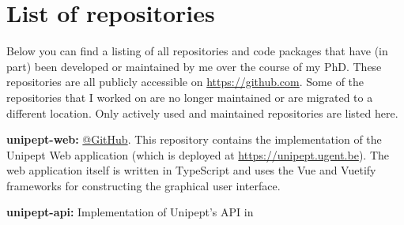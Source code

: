 \chapter*{List of repositories}

Below you can find a listing of all repositories and code packages that have (in part) been developed or maintained by me over the course of my PhD.
These repositories are all publicly accessible on \href{https://github.com}{https://github.com}.
Some of the repositories that I worked on are no longer maintained or are migrated to a different location.
Only actively used and maintained repositories are listed here.

\textbf{unipept-web:} \href{https://github.com/unipept/unipept-web}{@GitHub}.
This repository contains the implementation of the Unipept Web application (which is deployed at \href{https://unipept.ugent.be}{https://unipept.ugent.be}).
The web application itself is written in TypeScript and uses the Vue and Vuetify frameworks for constructing the graphical user interface.

\textbf{unipept-api:} Implementation of Unipept's API in

\newpage
